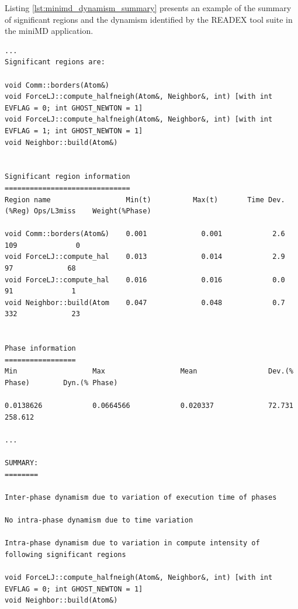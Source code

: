 Listing \ref{lst:minimd_dynamism_summary} presents an example of the summary of significant regions and the dynamism identified by the READEX tool suite in the miniMD application.

\begin{lstlisting}[caption={Summary of Application Pre-analysis},label=lst:minimd_dynamism_summary]
...
Significant regions are:

void Comm::borders(Atom&)
void ForceLJ::compute_halfneigh(Atom&, Neighbor&, int) [with int EVFLAG = 0; int GHOST_NEWTON = 1]
void ForceLJ::compute_halfneigh(Atom&, Neighbor&, int) [with int EVFLAG = 1; int GHOST_NEWTON = 1]
void Neighbor::build(Atom&)


Significant region information
==============================
Region name                  Min(t)          Max(t)       Time Dev.(%Reg) Ops/L3miss    Weight(%Phase)

void Comm::borders(Atom&)    0.001             0.001            2.6           109              0
void ForceLJ::compute_hal    0.013             0.014            2.9            97             68
void ForceLJ::compute_hal    0.016             0.016            0.0            91              1
void Neighbor::build(Atom    0.047             0.048            0.7           332             23


Phase information
=================
Min                  Max                  Mean                 Dev.(% Phase)        Dyn.(% Phase)

0.0138626            0.0664566            0.020337             72.731               258.612

...

SUMMARY:
========

Inter-phase dynamism due to variation of execution time of phases

No intra-phase dynamism due to time variation

Intra-phase dynamism due to variation in compute intensity of following significant regions

void ForceLJ::compute_halfneigh(Atom&, Neighbor&, int) [with int EVFLAG = 0; int GHOST_NEWTON = 1]
void Neighbor::build(Atom&)
\end{lstlisting}

